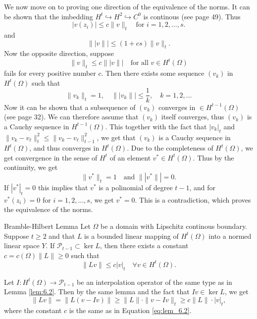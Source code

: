 \begin{bev}
We now move on to proving one direction of the equivalence of the norms. 
It can be shown that the imbedding $H^t\hookrightarrow H^2 \hookrightarrow C^0$ is continous (see \cite{Braess} page 49). Thus
\begin{equation*}
    |v(z_i)|\leq c\|v\|_t\quad \text{for } i=1,2,\ldots,s.
\end{equation*} 
and
\begin{equation*}
    \||v\||\leq (1+cs)\|v\|_t.
\end{equation*}
Now the opposite direction, suppose 
\begin{equation*}
    \|v\|_t\leq c\||v\||\quad \text{for all } v\in H^t(\Omega)
\end{equation*}
fails for every positive number $c$. Then there exists some sequence $(v_k)$ in $H^t(\Omega)$ such that
\begin{equation*}
    \|v_k\|_t=1,\quad \||v_k\||\leq \frac{1}{k},\quad k=1,2,\ldots
\end{equation*}
Now it can be shown that a subsequence of $(v_k)$ converges in $\in H^{t-1}(\Omega)$ (see \cite{Braess} page 32). We can therefore assume that $(v_k)$ itself converges, thus $(v_k)$ is a Cauchy sequence in $H^{t-1}(\Omega)$.
This together with the fact that $|v_k|_t$ and $\|v_k-v_\ell\|_t^2\leq\|v_k-v_\ell\|_{t-1}^2$, we get that $(v_k)$ is a Cauchy sequence in $H^t(\Omega)$, and thus converges in $H^t(\Omega)$.
Due to the completeness of $H^t(\Omega)$, we get convergence in the sense of $H^t$ of an element $v^*\in H^t(\Omega)$. 
Thus by the continuity, we get 
\begin{equation}
    \|v^*\|_t = 1\quad \text{and }\||v^*\||=0. 
\end{equation}
If $|v^*|_t = 0$ this implies that $v^*$ is a polinomial of degree $t-1$, and for $v^*(z_i)=0$ for $i=1,2,\ldots,s$, we get $v^*=0$. This is a contradiction, which proves the equivalence of the norms.
\end{bev}

\begin{lem}{Bramble-Hilbert Lemma}
    Let $\Omega$ be a domain with Lipschitz continous boundary. Suppose $t\geq 2$ and that $L$ is a bounded linear mapping of $H^t(\Omega)$ into a normed linear space $Y$.
    If $\mathcal{P}_{t-1}\subset \ker L$, then there exists a constant $c=c(\Omega)\|L\|\geq 0$ such that
    \begin{equation}
        \|Lv\|\leq c|v|_t\quad \forall v\in H^t(\Omega).
    \end{equation}
\end{lem}
\begin{bev}
    Let $I:H^t(\Omega)\rightarrow \mathcal{P}_{t-1}$ be an interpolation operator of the same type as in Lemma \ref{lem:6.2}. Then by the same lemma and the fact that $Iv\in\ker L$, we get
    \begin{equation}
        \|Lv\|=\|L(v-Iv)\|\geq \|L\|\cdot\|v-Iv\|_t\geq c\|L\| \cdot |v|_t,
    \end{equation}
    where the constant $c$  is the same as in Equation \ref{eq:lem_6.2}.
    \label{lem:6.3}
\end{bev}